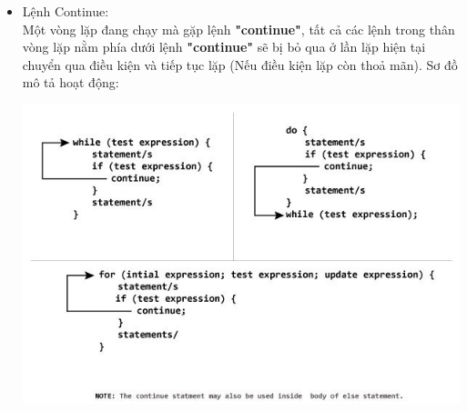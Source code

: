 \documentclass[12pt,a4paper]{article}
\begin{document}
\begin{itemize}
\begin{lstlisting}
}
\end{lstlisting}
	\item Lệnh Continue:\\
Một vòng lặp đang chạy mà gặp lệnh \textbf{"continue"}, tất cả các lệnh trong thân vòng lặp nằm phía dưới lệnh \textbf{"continue"} sẽ bị bỏ qua ở lần lặp hiện tại chuyển qua điều kiện và tiếp tục lặp (Nếu điều kiện lặp còn thoả mãn). Sơ đồ mô tả hoạt động:
\begin{center}
	\includegraphics[scale =0.7]{lenhcontinue}
\end{center}
\end{itemize}
\end{document}
